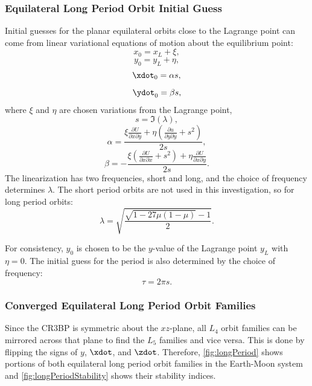 \subsubsection{Equilateral Long Period Orbit Initial Guess}
Initial guesses for the planar equilateral orbits close to the Lagrange point can come from linear
variational equations of motion about the equilibrium point:
\begin{equation}
    x_{0}=x_{L}+\xi,
    \label{eq:xvareq}
\end{equation}
\begin{equation}
    y_{0}=y_{L}+\eta,
    \label{eq:yvareq}
\end{equation}
\begin{equation}
    \xdot_{0}=\alpha s,
    \label{eq:xdotvareq}
\end{equation}
\begin{equation}
    \ydot_{0}=\beta s,
    \label{eq:ydotvareq}
\end{equation}
where $\xi$ and $\eta$ are chosen variations from the Lagrange point,
\begin{equation}
    s=\Im(\lambda),
    \label{eq:seq}
\end{equation}
\begin{equation}
    \alpha=\frac{\xi\frac{\partial U}{\partial x\partial y}+\eta(\frac{\partial u}{\partial y\partial y}+s^{2})}{2s},
    \label{eq:alphaeq}
\end{equation}
\begin{equation}
    \beta=-\frac{\xi(\frac{\partial U}{\partial x\partial x}+s^{2})+\eta\frac{\partial U}{\partial x\partial y}}{2s}.
    \label{eq:betaeq}
\end{equation}
The linearization has two frequencies, short and long, and the choice of frequency determines
$\lambda$. The short period orbits are not used in this investigation, so for long period orbits:
\begin{equation}
    \lambda=\sqrt{\frac{\sqrt{1-27\mu(1-\mu)}-1}{2}}.
    \label{eq:lambdaeq}
\end{equation}

For consistency, $y_{0}$ is chosen to be the $y$-value of the Lagrange point $y_{L}$ with $\eta=0$.
The initial guess for the period is also determined by the choice of frequency:
\begin{equation}
    \tau=2\pi s.
    \label{eq:taueq}
\end{equation}

\subsubsection{Converged Equilateral Long Period Orbit Families}
Since the CR3BP is symmetric about the $xz$-plane, all $L_{4}$ orbit families can be mirrored
across that plane to find the $L_{5}$ families and vice versa. This is done by flipping the signs
of $y$, $\xdot$, and $\zdot$. Therefore, \cref{fig:longPeriod} shows portions of both equilateral
long period orbit families in the Earth-Moon system and \cref{fig:longPeriodStability} shows their
stability indices. 

